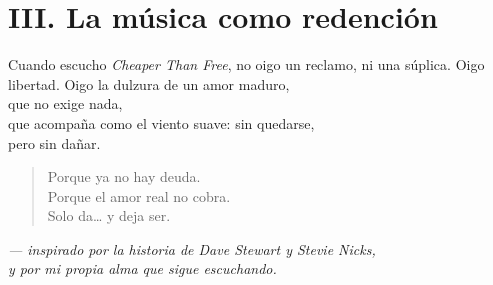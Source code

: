 \documentclass[12pt]{article}
\begin{document}
	\vspace{0.5cm}
	
	\section*{III. La música como redención}
	
	Cuando escucho \textit{Cheaper Than Free},  
	no oigo un reclamo,  
	ni una súplica.  
	Oigo libertad.  
	Oigo la dulzura de un amor maduro, \\
	que no exige nada, \\
	que acompaña como el viento suave: sin quedarse, \\
	pero sin dañar.
	
	\begin{verse}
		Porque ya no hay deuda. \\
		Porque el amor real no cobra. \\
		Solo da… y deja ser.
	\end{verse}
	
	\vspace{1cm}
	
	\begin{flushright}
		\textit{— inspirado por la historia de Dave Stewart y Stevie Nicks, \\
			y por mi propia alma que sigue escuchando.}
	\end{flushright}
	
	\newpage

	
\end{document}

